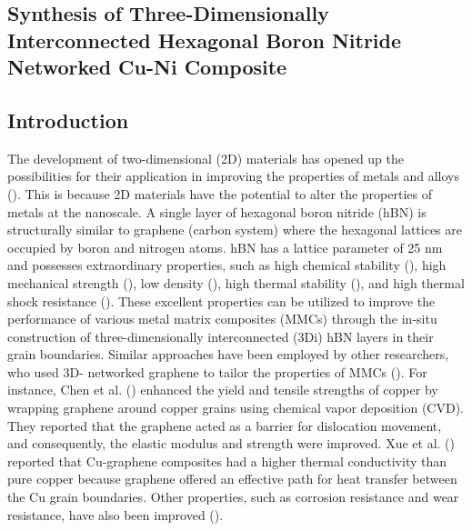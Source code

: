 
\begin{center}
\section{Synthesis of Three-Dimensionally Interconnected Hexagonal Boron Nitride Networked Cu-Ni Composite}
\end{center}

\subsection{Introduction}

The development of two-dimensional (2D) materials has opened up the possibilities for their application in improving the properties of metals and alloys (\cite {bartolucci2011graphene, chu2014enhanced, yang2018microstructure, li2019thermal}). This is because 2D materials have the potential to alter the properties of metals at the nanoscale. A single layer of hexagonal boron nitride (hBN) is structurally similar to graphene (carbon system) where the hexagonal lattices are occupied by boron and nitrogen atoms. hBN has a lattice parameter of 25 nm and possesses extraordinary properties, such as high chemical stability (\cite{singh2018effect}), high mechanical strength (\cite{singh2018effect}), low density (\cite{elkady2015physico}), high thermal stability (\cite{liu2013ultrathin}), and high thermal shock resistance (\cite{duan2016review}). These excellent properties can be utilized to improve the performance of various metal matrix composites (MMCs) through the in-situ construction of three-dimensionally interconnected (3Di) hBN layers in their grain boundaries. Similar approaches have been employed by other researchers, who used 3D- networked graphene to tailor the properties of MMCs (\cite{li2019thermal, chen2016fabrication, kim2018rapid, song2018hydrogen}). For instance, Chen et al. (\cite{chen2016fabrication}) enhanced the yield and tensile strengths of copper by wrapping graphene around copper grains using chemical vapor deposition (CVD). They reported that the graphene acted as a barrier for dislocation movement, and consequently, the elastic modulus and strength were improved. Xue et al. (\cite{li2019thermal}) reported that Cu-graphene composites had a higher thermal conductivity than pure copper because graphene offered an effective path for heat transfer between the Cu grain boundaries. Other properties, such as corrosion resistance and wear resistance, have also been improved (\cite{wu2019high, tripathi2017graphene}).

